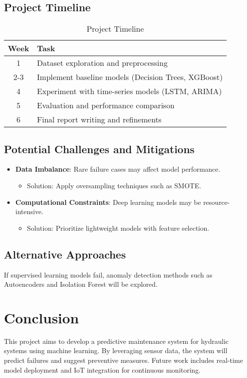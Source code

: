 \documentclass[sigconf]{acmart}
\begin{document}
\subsection{Project Timeline}
\begin{table}[h]
    \centering
    \begin{tabular}{|c|l|}
    \hline
    Week & Task \\
    \hline
    1 & Dataset exploration and preprocessing \\
    2-3 & Implement baseline models (Decision Trees, XGBoost) \\
    4 & Experiment with time-series models (LSTM, ARIMA) \\
    5 & Evaluation and performance comparison \\
    6 & Final report writing and refinements \\
    \hline
    \end{tabular}
    \caption{Project Timeline}
\end{table}

\subsection{Potential Challenges and Mitigations}
\begin{itemize}
    \item \textbf{Data Imbalance}: Rare failure cases may affect model performance.
    \begin{itemize}
        \item Solution: Apply oversampling techniques such as SMOTE.
    \end{itemize}
    \item \textbf{Computational Constraints}: Deep learning models may be resource-intensive.
    \begin{itemize}
        \item Solution: Prioritize lightweight models with feature selection.
    \end{itemize}
\end{itemize}

\subsection{Alternative Approaches}
If supervised learning models fail, anomaly detection methods such as Autoencoders and Isolation Forest will be explored.

\section{Conclusion}
This project aims to develop a predictive maintenance system for hydraulic systems using machine learning. By leveraging sensor data, the system will predict failures and suggest preventive measures. Future work includes real-time model deployment and IoT integration for continuous monitoring.
\end{document}
